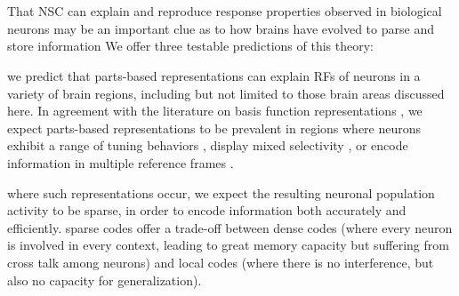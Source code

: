 \section*{}
\label{sec:discussion}

That \ac{NSC} can explain and reproduce response properties observed in biological neurons may be an important clue as to how brains have evolved to parse and store information
We offer three testable predictions of this theory:


 we predict that parts-based representations can explain
\acp{RF} of neurons in a variety of brain regions,
including but not limited to those brain areas discussed here. 
In agreement with the literature on basis function representations
\cite{PougetSejnowski1997,PougetSnyder2000,Poggio1990},
we expect parts-based representations
to be prevalent in regions where neurons
exhibit a range of tuning behaviors \cite{Beyeler2016},
display mixed selectivity \cite{Fusi2016,Eichenbaum2017},
or encode information in multiple reference frames \cite{AlexanderNitz2015,Rounds2016,Rounds2018}.

 where such representations occur, we expect the resulting
neuronal population activity to be  sparse,
in order to encode information both accurately and efficiently.
sparse codes offer a trade-off between 
dense codes (where every neuron is involved in every context,
leading to great memory capacity but suffering from cross talk among neurons)
and local codes (where there is no interference, 
but also no capacity for generalization).


